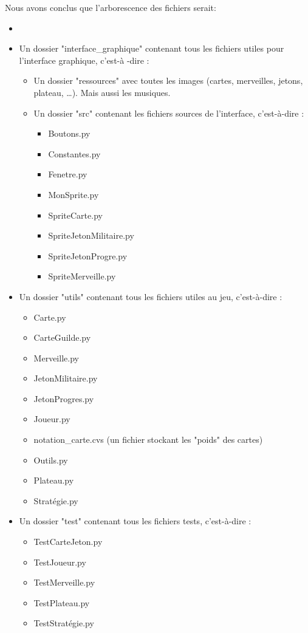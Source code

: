 \documentclass[a4paper, 12pt, french]{article}
\begin{document}
	Nous avons conclus que l'arborescence des fichiers serait:
	\begin{itemize}
		\item \item Un dossier "interface\_graphique" contenant tous les fichiers utiles pour l'interface graphique, c'est-à
		-dire :
		\begin{itemize}
			\item Un dossier "ressources" avec toutes les images (cartes, merveilles, jetons, plateau, \ldots). Mais
			aussi les musiques.
			\item Un dossier "src" contenant les fichiers sources de l'interface, c'est-à-dire :
			\begin{itemize}
				\item Boutons.py
				\item Constantes.py
				\item Fenetre.py
				\item MonSprite.py
				\item SpriteCarte.py
				\item SpriteJetonMilitaire.py
				\item SpriteJetonProgre.py
				\item SpriteMerveille.py
			\end{itemize}
		\end{itemize}
		\item Un dossier "utils" contenant tous les fichiers utiles au jeu, c'est-à-dire :
		\begin{itemize}
			\item Carte.py
			\item CarteGuilde.py
			\item Merveille.py
			\item JetonMilitaire.py
			\item JetonProgres.py
			\item Joueur.py
			\item notation\_carte.cvs (un fichier stockant les "poids" des cartes)
			\item Outils.py
			\item Plateau.py
			\item Stratégie.py
		\end{itemize}
		\item Un dossier "test" contenant tous les fichiers tests, c'est-à-dire :
		\begin{itemize}
			\item TestCarteJeton.py
			\item TestJoueur.py
			\item TestMerveille.py
			\item TestPlateau.py
			\item TestStratégie.py
		\end{itemize}
	\end{itemize}
\end{document}
